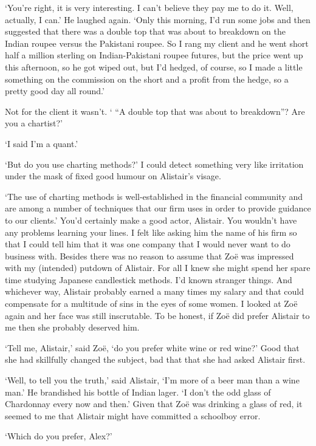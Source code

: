 `You're right, it is very interesting. I can't believe they pay me
to do it. Well, actually, I can.' He laughed again. `Only this
morning, I'd run some jobs and then suggested that there was a
double top that was about to breakdown on the Indian roupee versus
the Pakistani roupee. So I rang my client and he went short half a
million sterling on Indian-Pakistani roupee futures, but the price
went up this afternoon, so he got wiped out, but I'd hedged, of
course, so I made a little something on the commission on the short
{\twelveit and} a profit from the hedge, so a pretty good day all
round.'

Not for the client it wasn't. ` ``A double top that was about to
breakdown''? Are you a chartist?'

`I said I'm a quant.'

`But do you use charting methods?' I could detect something very
like irritation under the mask of fixed good humour on Alistair's
visage.

`The use of charting methods is well-established in the financial
community and are among a number of techniques that our firm uses in
order to provide guidance to our clients.' You'd certainly make a
good actor, Alistair. You wouldn't have any problems learning your
lines. I felt like asking him the name of his firm so that I could
tell him that it was one company that I would never want to do
business with. Besides there was no reason to assume that Zo{\"e}
was impressed with my (intended) putdown of Alistair. For all I knew
she might spend her spare time studying Japanese candlestick
methods. I'd known stranger things. And whichever way, Alistair
probably earned a many times my salary and that could compensate for
a multitude of sins in the eyes of some women. I looked at Zo{\"e}
again and her face was still inscrutable. To be honest, if Zo{\"e}
did prefer Alistair to me then she probably deserved him.

`Tell me, Alistair,' said Zo{\"e}, `do you prefer white wine or red
wine?' Good that she had skillfully changed the subject, bad that
that she had asked Alistair first.

`Well, to tell you the truth,' said Alistair, `I'm more of a beer
man than a wine man.' He brandished his bottle of Indian lager. `I
don't the odd glass of Chardonnay every now and then.' Given that
Zo{\"e} was drinking a glass of red, it seemed to me that Alistair
might have committed a schoolboy error.

`Which do you prefer, Alex?'

